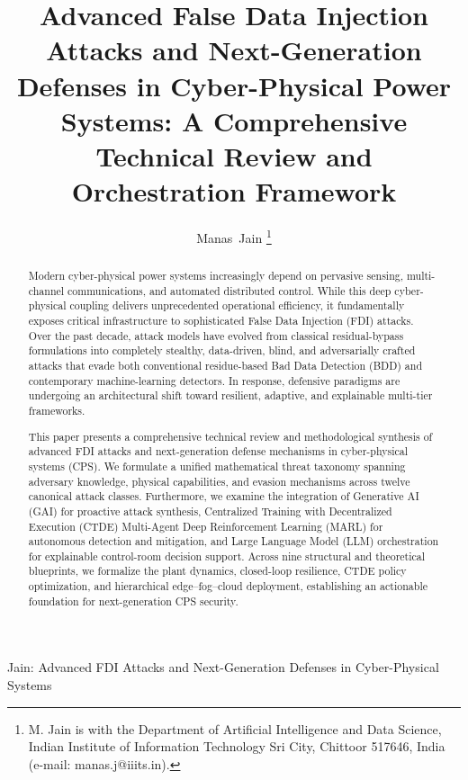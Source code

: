 \documentclass[journal,compsoc]{IEEEtran}
\begin{document}
\title{Advanced False Data Injection Attacks and Next-Generation Defenses in Cyber-Physical Power Systems: A Comprehensive Technical Review and Orchestration Framework}

\author{Manas~Jain
\thanks{M. Jain is with the Department of Artificial Intelligence and Data Science, Indian Institute of Information Technology Sri City, Chittoor 517646, India (e-mail: manas.j@iiits.in).}}

%
{Jain: Advanced FDI Attacks and Next-Generation Defenses in Cyber-Physical Systems}

\maketitle

\begin{abstract}
Modern cyber-physical power systems increasingly depend on pervasive sensing, multi-channel communications, and automated distributed control. While this deep cyber-physical coupling delivers unprecedented operational efficiency, it fundamentally exposes critical infrastructure to sophisticated False Data Injection (FDI) attacks. Over the past decade, attack models have evolved from classical residual-bypass formulations into completely stealthy, data-driven, blind, and adversarially crafted attacks that evade both conventional residue-based Bad Data Detection (BDD) and contemporary machine-learning detectors. In response, defensive paradigms are undergoing an architectural shift toward resilient, adaptive, and explainable multi-tier frameworks. 

This paper presents a comprehensive technical review and methodological synthesis of advanced FDI attacks and next-generation defense mechanisms in cyber-physical systems (CPS). We formulate a unified mathematical threat taxonomy spanning adversary knowledge, physical capabilities, and evasion mechanisms across twelve canonical attack classes. Furthermore, we examine the integration of Generative AI (GAI) for proactive attack synthesis, Centralized Training with Decentralized Execution (CTDE) Multi-Agent Deep Reinforcement Learning (MARL) for autonomous detection and mitigation, and Large Language Model (LLM) orchestration for explainable control-room decision support. Across nine structural and theoretical blueprints, we formalize the plant dynamics, closed-loop resilience, CTDE policy optimization, and hierarchical edge--fog--cloud deployment, establishing an actionable foundation for next-generation CPS security.
\end{abstract}
\end{document}
